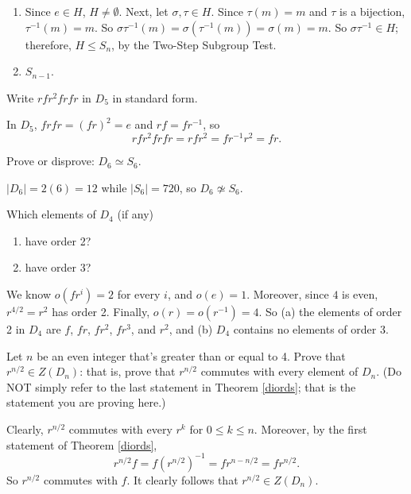 \begin{solution}[print=true]
\begin{enumerate}
\item Since $e\in H$, $H\neq \emptyset$.  Next, let $\sigma, \tau\in H$.  Since $\tau(m)=m$ and $\tau$ is a bijection, $\tau^{-1}(m)=m$.  So $\sigma \tau^{-1}(m)=\sigma(\tau^{-1}(m))=\sigma(m)=m$.  So $\sigma \tau^{-1}\in H$; therefore, $H\leq S_n$, by the Two-Step Subgroup Test.
\item $S_{n-1}$.
\end{enumerate}
\end{solution}

\begin{exercise}
Write $rfr^2frfr$ in $D_5$ in standard form.
\end{exercise}

\begin{solution}[print=true]
In $D_5$, $frfr=(fr)^2=e$ and $rf=fr^{-1}$, so $$rfr^2frfr=rfr^2=fr^{-1}r^2=fr.$$
\end{solution}


\begin{exercise}
Prove or disprove: $D_6\simeq S_6$.
\end{exercise}

\begin{solution}[print=true]
$|D_6|=2(6)=12$ while $|S_6|=720$, so $D_6\not\simeq S_6$.
\end{solution}

\begin{exercise}
Which elements of $D_4$ (if any)
\begin{enumerate}
\item have order 2?
\item have order $3$?
    \end{enumerate}
\end{exercise}

\begin{solution}[print=true]
We know $o(fr^i)=2$ for every $i$, and $o(e)=1$.  Moreover, since $4$ is even, $r^{4/2}=r^2$ has order 2. Finally, $o(r)=o(r^{-1})=4$. So (a) the elements of order 2 in $D_4$ are $f$, $fr$, $fr^2$, $fr^3$, and $r^2$, and (b) $D_4$ contains no elements of order 3.
\end{solution}

\begin{exercise} Let $n$ be an even integer that's greater than or equal to 4. Prove that $r^{n/2}\in Z(D_n)$: that is, prove that $r^{n/2}$ commutes with every element of $D_n$. (Do NOT simply refer to the last statement in Theorem \ref{diords}; that is the statement you are proving here.)
\end{exercise}

\begin{solution}[print=true]
Clearly, $r^{n/2}$ commutes with every $r^k$ for $0\leq k\leq n$.  Moreover, by the first statement of Theorem \ref{diords}, $$r^{n/2}f=f(r^{n/2})^{-1}=fr^{n-n/2}=fr^{n/2}.$$  So $r^{n/2}$ commutes with $f$.  It clearly follows that $r^{n/2}\in Z(D_n)$.
\end{solution}

